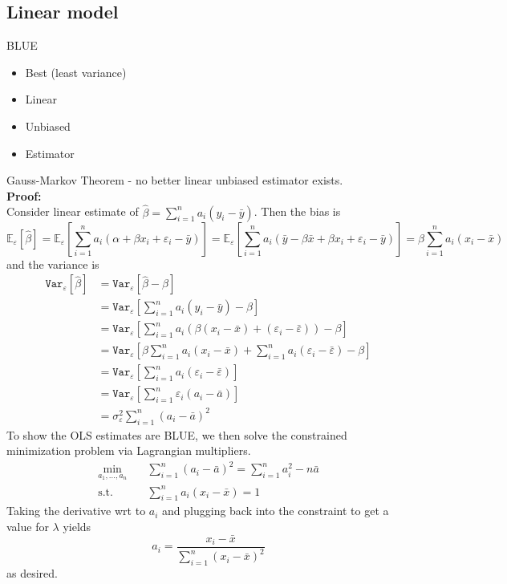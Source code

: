 \documentclass{article}
\begin{document}
\subsection{Linear model}
BLUE
\begin{itemize}
  \item Best (least variance)
  \item Linear
  \item Unbiased
  \item Estimator
\end{itemize}
Gauss-Markov Theorem - no better linear unbiased estimator exists.\newline \\
\textbf{Proof:}\\
Consider linear estimate of $\hat{\beta} = \sum_{i=1}^{n}a_i(y_i - \bar{y})$. Then the bias is
$$\mathbb{E}_\varepsilon[\hat{\beta}] = \mathbb{E}_\varepsilon\left[\sum_{i=1}^{n}a_i(\alpha + \beta x_i + \varepsilon_i - \bar{y})\right] = \mathbb{E}_\varepsilon\left[\sum_{i=1}^{n}a_i(\bar{y} - \beta \bar{x} + \beta x_i + \varepsilon_i - \bar{y})\right] = \beta \sum_{i=1}^{n}a_i(x_i - \bar{x})$$
and the variance is
\begin{align*}
  \mathtt{Var}_\varepsilon[\hat{\beta}] &= \mathtt{Var}_\varepsilon[\hat{\beta} - \beta] \\
  &= \mathtt{Var}_\varepsilon\left[\sum_{i=1}^{n}a_i(y_i - \bar{y}) - \beta\right] \\
  &= \mathtt{Var}_\varepsilon\left[\sum_{i=1}^{n}a_i(\beta(x_i - \bar{x}) + (\varepsilon_i - \bar{\varepsilon})) - \beta\right]\\
  &= \mathtt{Var}_\varepsilon\left[\beta\sum_{i=1}^{n}a_i(x_i - \bar{x}) + \sum_{i=1}^{n}a_i(\varepsilon_i - \bar{\varepsilon}) - \beta\right]\\
  &= \mathtt{Var}_\varepsilon\left[\sum_{i=1}^{n}a_i(\varepsilon_i - \bar{\varepsilon})\right]\\
  &= \mathtt{Var}_\varepsilon\left[\sum_{i=1}^{n}\varepsilon_i(a_i - \bar{a})\right]\\
  &= \sigma^2_\varepsilon \sum_{i=1}^{n}(a_i - \bar{a})^2
\end{align*}
To show the OLS estimates are BLUE, we then solve the constrained minimization problem via Lagrangian multipliers.
\begin{align*}
  \min_{a_1, \ldots, a_n} \quad &\sum_{i=1}^{n}(a_i - \bar{a})^2 = \sum_{i=1}^{n}a_i^2 - n\bar{a}\\
  \textrm{s.t.} \quad & \sum_{i=1}^{n}a_i(x_i - \bar{x}) = 1
\end{align*}
Taking the derivative wrt to $a_i$ and plugging back into the constraint to get a value for $\lambda$ yields
$$a_i = \frac{x_i - \bar{x}}{\sum_{i=1}^{n}(x_i - \bar{x})^2} $$
as desired.
\end{document}
